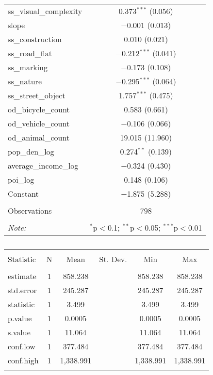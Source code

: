 \begin{table}[!htbp]
\begin{tabular}{@{\extracolsep{1pt}}lc}
  ss\_visual\_complexity & 0.373$^{***}$ (0.056) \\ 
  slope & $-$0.001 (0.013) \\ 
  ss\_construction & 0.010 (0.021) \\ 
  ss\_road\_flat & $-$0.212$^{***}$ (0.041) \\ 
  ss\_marking & $-$0.173 (0.108) \\ 
  ss\_nature & $-$0.295$^{***}$ (0.064) \\ 
  ss\_street\_object & 1.757$^{***}$ (0.475) \\ 
  od\_bicycle\_count & 0.583 (0.661) \\ 
  od\_vehicle\_count & $-$0.106 (0.066) \\ 
  od\_animal\_count & 19.015 (11.960) \\ 
  pop\_den\_log & 0.274$^{**}$ (0.139) \\ 
  average\_income\_log & $-$0.324 (0.430) \\ 
  poi\_log & 0.148 (0.106) \\ 
  Constant & $-$1.875 (5.288) \\ 
 \hline \\[-1.8ex] 
Observations & 798 \\ 
\hline 
\hline \\[-1.8ex] 
\textit{Note:}  & \multicolumn{1}{r}{$^{*}$p$<$0.1; $^{**}$p$<$0.05; $^{***}$p$<$0.01} \\ 
\end{tabular} 
\end{table} 

\begin{table}[!htbp] \centering 
  \caption{} 
  \label{} 
\small 
\begin{tabular}{@{\extracolsep{1pt}}lccccc} 
\\[-1.8ex]\hline 
\hline \\[-1.8ex] 
Statistic & \multicolumn{1}{c}{N} & \multicolumn{1}{c}{Mean} & \multicolumn{1}{c}{St. Dev.} & \multicolumn{1}{c}{Min} & \multicolumn{1}{c}{Max} \\ 
\hline \\[-1.8ex] 
estimate & 1 & 858.238 &  & 858.238 & 858.238 \\ 
std.error & 1 & 245.287 &  & 245.287 & 245.287 \\ 
statistic & 1 & 3.499 &  & 3.499 & 3.499 \\ 
p.value & 1 & 0.0005 &  & 0.0005 & 0.0005 \\ 
s.value & 1 & 11.064 &  & 11.064 & 11.064 \\ 
conf.low & 1 & 377.484 &  & 377.484 & 377.484 \\ 
conf.high & 1 & 1,338.991 &  & 1,338.991 & 1,338.991 \\ 
\hline \\[-1.8ex] 
\end{tabular} 
\end{table} 

